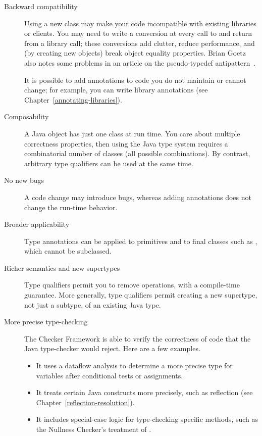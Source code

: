 \begin{description}

\item[Backward compatibility]
Using a new class may make your code incompatible with existing libraries or
clients.  You may need to write a conversion at every call to and return
from a library call; these conversions add clutter, reduce performance, and
(by creating new objects) break object equality properties.
Brian Goetz also notes some problems in an article on the
pseudo-typedef antipattern~\cite{Goetz2006:typedef}.

It is possible to add annotations to code you do not maintain or cannot
change; for example, you
can write library annotations (see Chapter~\ref{annotating-libraries}).

\item[Composability]
A Java object has just one class at run time.  You care about multiple
correctness properties, then using the Java type system requires a
combinatorial number of classes (all possible combinations).  By contrast,
arbitrary type qualifiers can be used at the same time.

\item[No new bugs]
A code change may introduce bugs, whereas adding
annotations does not change the run-time behavior.

\item[Broader applicability]
Type annotations can be applied to primitives and to final classes such as
, which cannot be subclassed.

\item[Richer semantics and new supertypes]
Type qualifiers permit you to remove operations, with a compile-time
guarantee.  More
generally, type qualifiers permit creating a new supertype, not just a
subtype, of an existing Java type.

\item[More precise type-checking]
The Checker Framework is able to verify the correctness of code that the
Java type-checker would reject.  Here are a few examples.
\begin{itemize}
\item
  It uses a dataflow analysis to determine a more precise type for
  variables after conditional tests or assignments.
\item
  It treats certain Java constructs more precisely, such as
  reflection (see Chapter~\ref{reflection-resolution}).
\item
  It includes special-case logic for type-checking specific methods, such
  as the Nullness Checker's treatment of .
\end{itemize}


\end{description}
